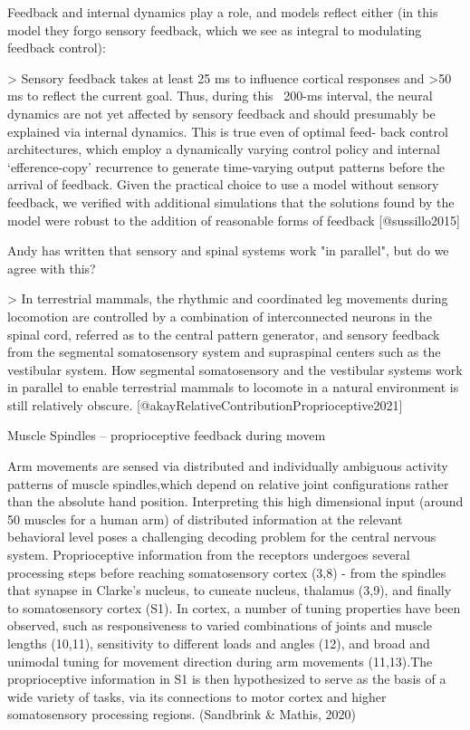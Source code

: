 \documentclass[../main.tex]{subfiles}
\begin{document}
{{Feedback and internal dynamics play a role, and models reflect either (in this model they forgo sensory feedback, which we see as integral to modulating feedback control):

> Sensory feedback takes at least 25 ms to influence cortical responses and >50 ms to reflect the current goal. Thus, during this ~200-ms interval, the neural dynamics are not yet affected by sensory feedback and should presumably be explained via internal dynamics. This is true even of optimal feed- back control architectures, which employ a dynamically varying control policy and internal ‘efference-copy’ recurrence to generate time-varying output patterns before the arrival of feedback. Given the practical choice to use a model without sensory feedback, we verified with additional simulations that the solutions found by the model were robust to the addition of reasonable forms of feedback [@sussillo2015]

Andy has written that sensory and spinal systems work "in parallel", but do we agree with this?

> In terrestrial mammals, the rhythmic and coordinated leg movements during locomotion are controlled by a combination of interconnected neurons in the spinal cord, referred as to the central pattern generator, and sensory feedback from the segmental somatosensory system and supraspinal centers such as the vestibular system. How segmental somatosensory and the vestibular systems work in parallel to enable terrestrial mammals to locomote in a natural environment is still relatively obscure. [@akayRelativeContributionProprioceptive2021] 

 Muscle Spindles -- proprioceptive feedback during movem

Arm  movements  are  sensed  via  distributed  and  individually  ambiguous  activity  patterns  of  muscle  spindles,which depend on relative joint configurations rather than the absolute hand position.  Interpreting this high dimensional  input  (around  50  muscles  for  a  human  arm)  of  distributed information at the relevant behavioral level poses a challenging  decoding  problem  for  the  central  nervous  system. Proprioceptive information from the receptors undergoes several  processing  steps  before  reaching  somatosensory  cortex (3,8) - from the spindles that synapse in Clarke’s nucleus, to cuneate nucleus, thalamus (3,9), and finally to somatosensory cortex (S1).   In cortex,  a number of tuning properties have been observed, such as responsiveness to varied combinations of joints and muscle lengths (10,11), sensitivity to different loads and angles (12), and broad and unimodal tuning for movement direction during arm movements (11,13).The proprioceptive information in S1 is then hypothesized to serve as the basis of a wide variety of tasks, via its connections to motor cortex and higher somatosensory processing regions. (Sandbrink & Mathis, 2020) 


}}
\end{document}
